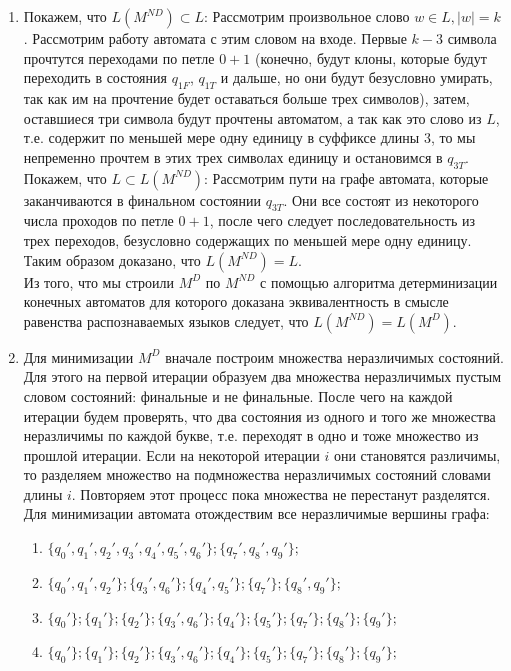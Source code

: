 \begin{enumerate}[label=(\roman{*})]
	\item
		Покажем, что $L(M^{ND}) \subset L$: Рассмотрим произвольное слово $w \in L, |w| = k$. Рассмотрим работу автомата с этим словом на входе. Первые $k-3$ символа прочтутся переходами по петле $0+1$ (конечно, будут клоны, которые будут переходить в состояния $q_{1F}$, $q_{1T}$ и дальше, но они будут безусловно умирать, так как им на прочтение будет оставаться больше трех символов), затем, оставшиеся три символа будут прочтены автоматом, а так как это слово из $L$, т.е. содержит по меньшей мере одну единицу в суффиксе длины $3$, то мы непременно прочтем в этих трех символах единицу и остановимся в $q_{3T}$.\\
		Покажем, что $L \subset L(M^{ND})$: Рассмотрим пути на графе автомата, которые заканчиваются в финальном состоянии $q_{3T}$. Они все состоят из некоторого числа проходов по петле $0+1$, после чего следует последовательность из трех переходов, безусловно содержащих по меньшей мере одну единицу.\\
		Таким образом доказано, что $L(M^{ND}) = L$.\\
		Из того, что мы строили $M^D$ по $M^{ND}$ с помощью алгоритма детерминизации конечных автоматов для которого доказана эквивалентность в смысле равенства распознаваемых языков следует, что $L(M^{ND}) = L(M^D)$.
	\item Для минимизации $M^{D}$ вначале построим множества неразличимых состояний. Для этого на первой итерации образуем два множества неразличимых пустым словом состояний: финальные и не финальные. После чего на каждой итерации будем проверять, что два состояния из одного и того же множества неразличимы по каждой букве, т.е. переходят в одно и тоже множество из прошлой итерации. Если на некоторой итерации $i$ они становятся различимы, то разделяем множество на подмножества неразличимых состояний словами длины $i$. Повторяем этот процесс пока множества не перестанут разделятся. Для минимизации автомата отождествим все неразличимые вершины графа:
		\begin{enumerate}[label=Итерация №\arabic*:]
			\item $\{q_0', q_1', q_2', q_3', q_4', q_5', q_6'\}; \{q_7', q_8', q_9'\};$
			\item $\{q_0', q_1', q_2'\}; \{q_3', q_6'\}; \{q_4', q_5'\}; \{q_7'\}; \{q_8', q_9'\};$
			\item $\{q_0'\}; \{q_1'\}; \{q_2'\}; \{q_3', q_6'\}; \{q_4'\}; \{q_5'\}; \{q_7'\}; \{q_8'\}; \{q_9'\};$
			\item $\{q_0'\}; \{q_1'\}; \{q_2'\}; \{q_3', q_6'\}; \{q_4'\}; \{q_5'\}; \{q_7'\}; \{q_8'\}; \{q_9'\};$
		\end{enumerate}
		

\end{enumerate}

